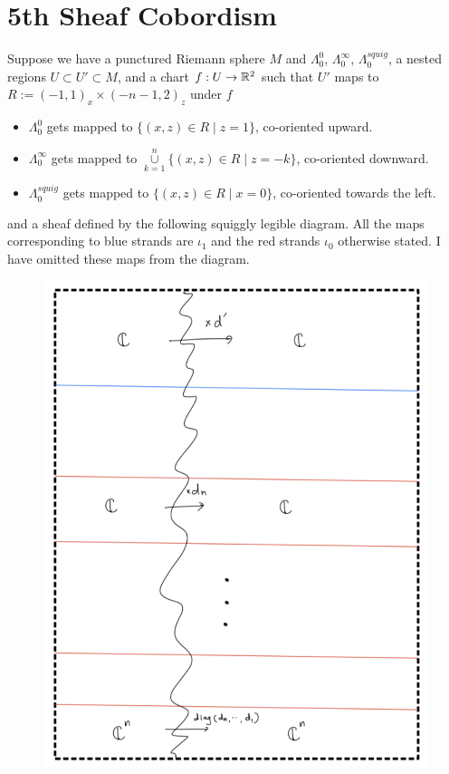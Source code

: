 \section{5th Sheaf Cobordism}
Suppose we have a punctured Riemann sphere $M$ and $\Lambda_0^0$, $\Lambda_0^\infty$, $\Lambda_0^{squig}$, a nested regions $U\subset U' \subset M$, and a chart $f : U \rightarrow \mathbb{R}^2$ such that $U'$ maps to $R:=(-1,1)_x \times (-n-1,2)_z$ under $f$
\begin{itemize}
\item $\Lambda_0^0$ gets mapped to $\{(x,z)\in R \mid z=1\}$, co-oriented upward.

\item $\Lambda_0^\infty$ gets mapped to $\overset{n}{\underset{k=1}{\cup}}\{(x,z)\in R \mid z=-k\}$, co-oriented downward.

\item $\Lambda_0^{squig}$ gets mapped to $\{(x,z)\in R \mid x=0\}$, co-oriented towards the left.
\end{itemize}
and a sheaf defined by the following squiggly legible diagram. All the maps corresponding to blue strands are $\iota_1$ and the red strands $\iota_0$ otherwise stated. I have omitted these maps from the diagram.\\

\begin{figure}[H]
    \centering
    \includegraphics[scale = 0.95]{diagrams/cobord5/1.png} 
    \caption{}
    \label{fig:your-label}
\end{figure}

